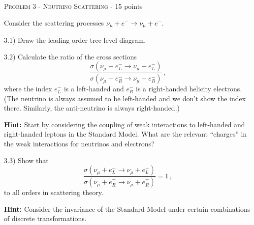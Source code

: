 \documentclass[a4paper,11pt]{report}
\begin{document}
\vspace{1cm}

{\large \textsc{Problem 3 - Neutrino Scattering} - 15 points}

Consider the scattering processes $\nu_\mu +e^- \to \nu_\mu +e^-$. 

3.1) Draw the leading order tree-level diagram.

3.2) Calculate the ratio of the cross sections
\begin{equation}
\frac{\sigma(\nu_\mu +e_L^- \to \nu_\mu +e_L^-)}{\sigma(\nu_\mu +e_R^- \to \nu_\mu +e_R^-)}\,,
\end{equation} 
where the index $e^-_L$ is a left-handed and $e^-_R$ is a right-handed helicity electrons. (The neutrino is always assumed to be left-handed and we don't show the index there. Similarly, the anti-neutrino is always right-handed.)

{\bf Hint:} Start by considering the coupling of weak interactions to left-handed and right-handed leptons in the Standard Model. What are the relevant ``charges'' in the weak interactions for neutrinos and electrons?

3.3) Show that 
\begin{equation}
\frac{\sigma(\nu_\mu +e_L^- \to \nu_\mu +e_L^-)}{\sigma(\overline\nu_\mu +e_R^+ \to \overline\nu_\mu +e_R^+)}=1\,,
\end{equation}
to all orders in scattering theory.

{\bf Hint:} Consider the invariance of the Standard Model under certain combinations of discrete transformations.
\end{document}
